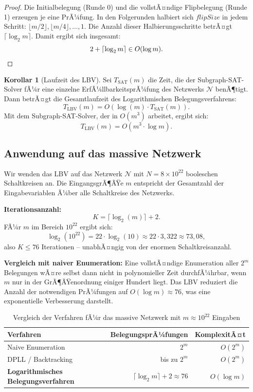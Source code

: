 ﻿\documentclass[a4paper,12pt]{article}
\theoremstyle{definition}
\newtheorem{korollar}{Korollar}
\begin{document}
\begin{proof}
	Die Initialbelegung (Runde 0) und die vollstÃ¤ndige Flipbelegung (Runde 1) erzeugen
	je eine PrÃ¼fung. In den Folgerunden halbiert sich $\mathit{flipSize}$ in jedem Schritt:
	$\lfloor m/2 \rfloor, \lfloor m/4 \rfloor, \ldots, 1$. Die Anzahl dieser Halbierungsschritte
	betrÃ¤gt $\lceil \log_2 m \rceil$. Damit ergibt sich insgesamt:
	\[
	2 + \lceil \log_2 m \rceil \in O(\log m). \qedhere
	\]
\end{proof}

\begin{korollar}[Laufzeit des LBV]
	Sei $T_{\mathrm{SAT}}(m)$ die Zeit, die der Subgraph-SAT-Solver fÃ¼r eine einzelne
	ErfÃ¼llbarkeitsprÃ¼fung des Netzwerks $\mathcal{N}$ benÃ¶tigt. Dann betrÃ¤gt die
	Gesamtlaufzeit des Logarithmischen Belegungsverfahrens:
	\[
	T_{\mathrm{LBV}}(m) = O\!\left(\log(m) \cdot T_{\mathrm{SAT}}(m)\right).
	\]
	Mit dem Subgraph-SAT-Solver, der in $O(m^3)$ arbeitet, ergibt sich:
	\[
	T_{\mathrm{LBV}}(m) = O\!\left(m^3 \cdot \log m\right).
	\]
\end{korollar}

\subsection{Anwendung auf das massive Netzwerk}

Wir wenden das LBV auf das Netzwerk $\mathcal{N}$ mit $N = 8 \times 10^{22}$ booleschen
Schaltkreisen an. Die EingangsgrÃ¶ÃŸe $m$ entspricht der Gesamtzahl der Eingabevariablen
Ã¼ber alle Schaltkreise des Netzwerks.

\medskip
\noindent\textbf{Iterationsanzahl:}
\[
K = \lceil \log_2(m) \rceil + 2.
\]
FÃ¼r $m$ im Bereich $10^{22}$ ergibt sich:
\[
\log_2(10^{22}) = 22 \cdot \log_2(10) \approx 22 \cdot 3{,}322 \approx 73{,}08,
\]
also $K \leq 76$ Iterationen -- unabhÃ¤ngig von der enormen Schaltkreisanzahl.

\medskip
\noindent\textbf{Vergleich mit naiver Enumeration:}
Eine vollstÃ¤ndige Enumeration aller $2^m$ Belegungen wÃ¤re selbst dann nicht in polynomieller
Zeit durchfÃ¼hrbar, wenn $m$ nur in der GrÃ¶ÃŸenordnung einiger Hundert liegt. Das LBV reduziert
die Anzahl der notwendigen PrÃ¼fungen auf $O(\log m) \approx 76$, was eine exponentielle
Verbesserung darstellt.

\begin{table}[h]
	\centering
	\begin{tabular}{lrr}
		\toprule
		\textbf{Verfahren} & \textbf{BelegungsprÃ¼fungen} & \textbf{KomplexitÃ¤t} \\
		\midrule
		Naive Enumeration & $2^m$ & $O(2^m)$ \\
		DPLL / Backtracking & bis zu $2^m$ & $O(2^m)$ \\
		\textbf{Logarithmisches Belegungsverfahren} & $\lceil \log_2 m \rceil + 2 \approx 76$ & $O(\log m)$ \\
		\bottomrule
	\end{tabular}
	\caption{Vergleich der Verfahren fÃ¼r das massive Netzwerk mit $m \approx 10^{22}$ Eingaben}
	\label{tab:lbv-vergleich}
\end{table}
\end{document}
